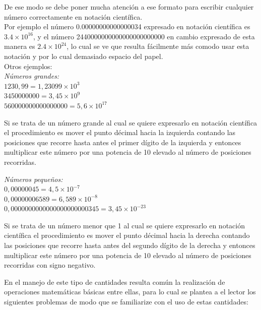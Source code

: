 \documentclass[a5paper,pagesize,10pt,bibtotoc,pointlessnumbers,
normalheadings,DIV=9,fleqn,x11names,table,twoside=false]{scrbook}
\begin{document}
De ese modo se debe poner mucha atención a ese formato para escribir cualquier número correctamente en notación científica.\\

Por ejemplo el número 0.00000000000000034 expresado en notación científica es $3.4\times10^{16}$, y el número 
2440000000000000000000000 en cambio expresado de esta manera es $2.4\times10^{24}$, lo cual se ve que resulta fácilmente más 
comodo usar esta notación y por lo cual demasiado espacio del 
papel.\\

Otros ejemplos:\\

\textit{Números grandes:}\\

$1230,99 = 1,23099\times10^3$\\
$3450000000 = 3,45\times10^{9}$\\
$560000000000000000 = 5,6\times10^{17}$ 

\begin{tcolorbox}
Si se trata de un número grande al cual se quiere expresarlo en notación científica el procedimiento es mover el punto décimal 
hacia la izquierda contando las posiciones que recorre hasta antes el primer dígito de la izquierda y entonces multiplicar este 
número por una potencia de 10 elevado al 
número de posiciones recorridas. 
\end{tcolorbox}

\textit{Números pequeños:}\\

$0,00000045 = 4,5\times10^{-7}$\\
$0,00000006589 = 6,589\times10^{-8}$\\
$0,0000000000000000000000345 = 3,45\times10^{-23}$\\

\begin{tcolorbox}
Si se trata de un número menor que 1 al cual se quiere expresarlo en notación científica el procedimiento es mover el punto 
décimal hacia la derecha contando las posiciones que recorre hasta antes del segundo dígito de la derecha y entonces multiplicar 
este número por una potencia de 10 elevado al 
número de posiciones recorridas con signo negativo. 
\end{tcolorbox}

En el manejo de este tipo de cantidades resulta común la realización de operaciones matemáticas básicas entre ellas, para lo cual 
se plantea a el lector los siguientes problemas de modo que se familiarize con el uso de estas cantidades:
\end{document}
